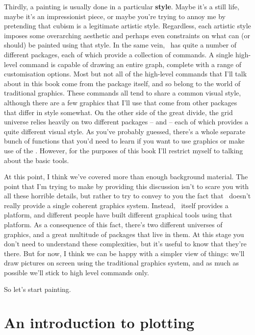 Thirdly, a painting is usually done in a particular {\bf style}. Maybe it's a still life, maybe it's an impressionist piece, or maybe you're trying to annoy me by pretending that cubism is a legitimate artistic style. Regardless, each artistic style imposes some overarching aesthetic and perhaps even constraints on what can (or should) be painted using that style. In the same vein, \R\ has quite a number of different packages, each of which provide a collection of  commands. A single high-level command is capable of drawing an entire graph, complete with a range of customisation options. Most but not all of the high-level commands that I'll talk about in this book come from the  package itself, and so belong to the world of traditional graphics. These commands all tend to share a common visual style, although there are a few graphics that I'll use that come from other packages that differ in style somewhat. On the other side of the great divide, the grid universe relies heavily on two different packages --  and  -- each of which provides a quite different visual style. As you've probably guessed, there's a whole separate bunch of functions that you'd need to learn if you want to use  graphics or make use of the . However, for the purposes of this book I'll restrict myself to talking about the basic  tools. 


At this point, I think we've covered more than enough background material. The point that I'm trying to make by providing this discussion isn't to scare you with all these horrible details, but rather to try to convey to you the fact that \R\ doesn't really provide a single coherent graphics system. Instead, \R\ itself provides a platform, and different people have built different graphical tools using that platform. As a consequence of this fact, there's two different universes of graphics, and a great multitude of packages that live in them. At this stage you don't need to understand these complexities, but it's useful to know that they're there. But for now, I think we can be happy with a simpler view of things: we'll draw pictures on screen using the traditional graphics system, and as much as possible we'll stick to high level commands only.

So let's start painting.

\section{An introduction to plotting~\label{sec:introplotting}}

